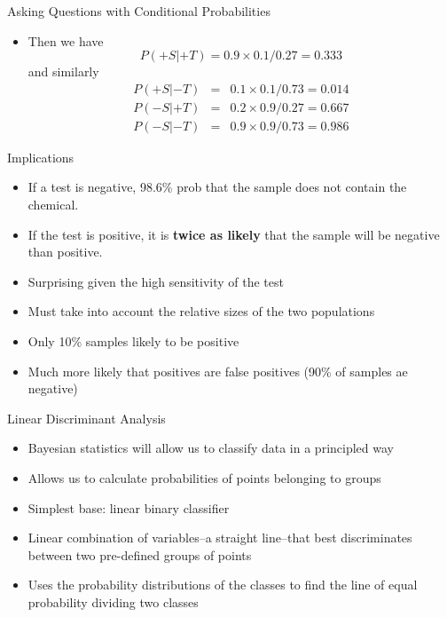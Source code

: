 \documentclass[aspectratio=169]{beamer}
\begin{document}
\begin{frame}{Asking Questions with Conditional Probabilities}
  \begin{itemize}
     \item Then we have
       \begin{equation*}
         P(+S|+T) = 0.9\times0.1/0.27 = 0.333
        \end{equation*}
       and similarly
       \begin{eqnarray*}
          P(+S|-T) &=& 0.1\times0.1/0.73 = 0.014\\
          P(-S|+T) &=& 0.2\times0.9/0.27 = 0.667\\
          P(-S|-T) &=& 0.9\times0.9/0.73 = 0.986
       \end{eqnarray*}
  \end{itemize}
\end{frame}

\begin{frame}{Implications}
  \begin{itemize}
    \item If a test is negative, 98.6\% prob that the sample does not contain the chemical.
    \item If the test is positive, it is \textbf{twice as likely} that the sample will be negative than positive.
    \item Surprising given the high sensitivity of the test
    \item Must take into account the relative sizes of the two populations
    \item Only 10\% samples likely to be positive
    \item Much more likely that positives are false positives (90\% of samples ae negative)
  \end{itemize}
\end{frame}

\begin{frame}{Linear Discriminant Analysis}
  \begin{itemize}
    \item Bayesian statistics will allow us to classify data in a principled way
    \item Allows us to calculate probabilities of points belonging to groups
    \item Simplest base: linear binary classifier
    \item Linear combination of variables--a straight line--that best discriminates between two pre-defined groups of points
    \item Uses the probability distributions of the classes to find the line of equal probability dividing two classes
  \end{itemize}
\end{frame}
\end{document}
